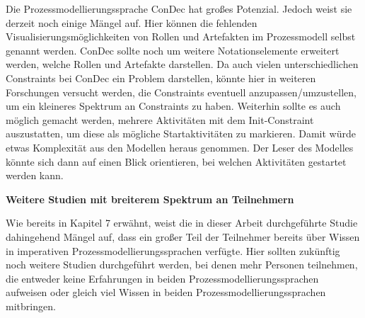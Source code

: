 Die Prozessmodellierungssprache ConDec hat großes Potenzial. Jedoch weist sie derzeit noch einige Mängel auf. Hier können die fehlenden Visualisierungsmöglichkeiten von Rollen und Artefakten im Prozessmodell selbst genannt werden. ConDec sollte noch um weitere Notationselemente erweitert werden, welche Rollen und Artefakte darstellen.\newline
Da auch vielen unterschiedlichen Constraints bei ConDec ein Problem darstellen, könnte hier in weiteren Forschungen versucht werden, die Constraints eventuell anzupassen/umzustellen, um ein kleineres Spektrum an Constraints zu haben.\newline
Weiterhin sollte es auch möglich gemacht werden, mehrere Aktivitäten mit dem Init-Constraint auszustatten, um diese als mögliche Startaktivitäten zu markieren. Damit würde etwas Komplexität aus den Modellen heraus genommen. Der Leser des Modelles könnte sich dann auf einen Blick orientieren, bei welchen Aktivitäten gestartet werden kann.\newline

\textbf{Weitere Studien mit breiterem Spektrum an Teilnehmern}

Wie bereits in Kapitel 7 erwähnt, weist die in dieser Arbeit durchgeführte Studie dahingehend Mängel auf, dass ein großer Teil der Teilnehmer bereits über Wissen in imperativen Prozessmodellierungssprachen verfügte. Hier sollten zukünftig noch weitere Studien durchgeführt werden, bei denen mehr Personen teilnehmen, die entweder keine Erfahrungen in beiden Prozessmodellierungssprachen aufweisen oder gleich viel Wissen in beiden Prozessmodellierungssprachen mitbringen.\newline




